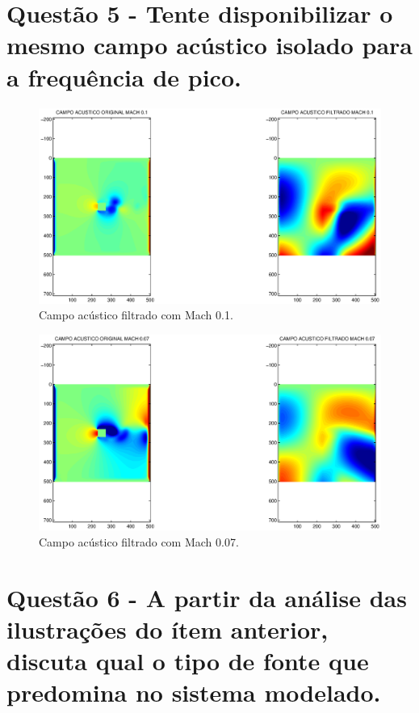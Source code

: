 \newpage
\section{Questão 5 - Tente disponibilizar o mesmo campo acústico isolado para a frequência de pico.}
\begin{figure}[h!]
    \centering
    \hspace{-3.cm}
    \includegraphics[width=1.2\textwidth]{Mach_0.1/campo_acustico_filtrado.eps}
    \caption{Campo acústico filtrado com Mach 0.1.}
\end{figure}

\begin{figure}[h!]
    \centering
    \hspace{-3.cm}
    \includegraphics[width=1.2\textwidth]{Mach_0.07/campo_pressao_filtrado.eps}
    \caption{Campo acústico filtrado com Mach 0.07.}
\end{figure}

\section{Questão 6 - A partir da análise das ilustrações do ítem anterior, discuta qual o tipo de fonte que predomina no sistema modelado.}

